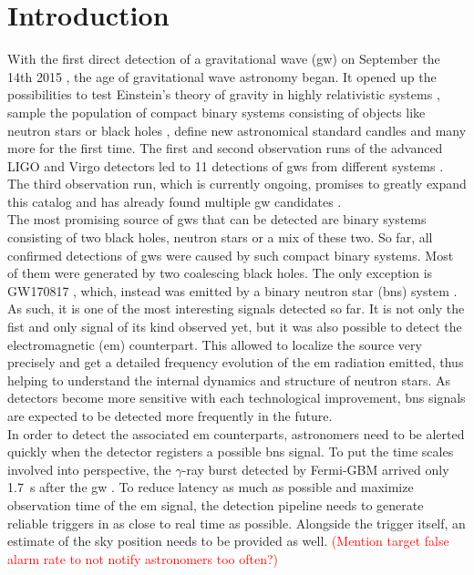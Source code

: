 \section{Introduction}
With the first direct detection of a gravitational wave (\gls{gw}) on September the 14th 2015 \cite{gw150914}, the age of gravitational wave astronomy began. It opened up the possibilities to test Einstein's theory of gravity in highly relativistic systems \cite{test_gr_gw150914}, sample the population of compact binary systems consisting of objects like neutron stars or black holes \cite{population_binary_systems}, define new astronomical standard candles \cite{standard_candles} and many more for the first time. The first and second observation runs of the advanced LIGO and Virgo detectors \cite{aligo, avirgo} led to 11 detections of \gls{gw}s from different systems \cite{catalog}. The third observation run, which is currently ongoing, promises to greatly expand this catalog and has already found multiple \gls{gw} candidates \cite{o3_alerts}.\\
The most promising source of \gls{gw}s that can be detected are binary systems consisting of two black holes, neutron stars or a mix of these two. So far, all confirmed detections of \gls{gw}s were caused by such compact binary systems. Most of them were generated by two coalescing black holes. The only exception is GW170817 \cite{catalog}, which, instead was emitted by a binary neutron star (\gls{bns}) system \cite{gw170817}. As such, it is one of the most interesting signals detected so far. It is not only the fist and only signal of its kind observed yet, but it was also possible to detect the electromagnetic (\gls{em}) counterpart. This allowed to localize the source very precisely and get a detailed frequency evolution of the \gls{em} radiation emitted, thus helping to understand the internal dynamics and structure of neutron stars. As detectors become more sensitive with each technological improvement, \gls{bns} signals are expected to be detected more frequently in the future.\\
In order to detect the associated \gls{em} counterparts, astronomers need to be alerted quickly when the detector registers a possible \gls{bns} signal. To put the time scales involved into perspective, the $\gamma$-ray burst detected by Fermi-GBM arrived only \SI{1.7}{\s} after the \gls{gw} \cite{gw170817}. To reduce latency as much as possible and maximize observation time of the \gls{em} signal, the detection pipeline needs to generate reliable triggers in as close to real time as possible. Alongside the trigger itself, an estimate of the sky position needs to be provided as well. \textcolor{red}{(Mention target false alarm rate to not notify astronomers too often?)}\\
